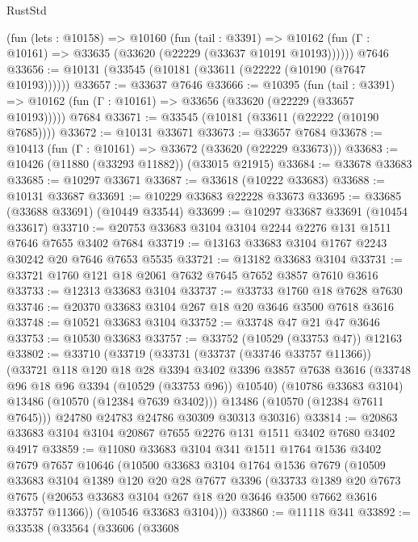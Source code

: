 \begin{lexlean}{RustStd}
\begin{coremodule}
    (fun (lets : @10158) =>
    @10160
      (fun (tail : @3391) =>
      @10162 (fun (Γ : @10161) => @33635 (@33620 (@22229 (@33637 @10191 @10193))))))
    @7646
@33656 := @10131 (@33545 (@10181 (@33611 (@22222 (@10190 (@7647 @10193))))))
@33657 := @33637 @7646
@33666 := @10395
    (fun (tail : @3391) => @10162 (fun (Γ : @10161) => @33656 (@33620 (@22229 (@33657 @10193)))))
    @7684
@33671 := @33545 (@10181 (@33611 (@22222 (@10190 @7685))))
@33672 := @10131 @33671
@33673 := @33657 @7684
@33678 := @10413 (fun (Γ : @10161) => @33672 (@33620 (@22229 @33673)))
@33683 := @10426 (@11880 (@33293 @11882)) (@33015 @21915)
@33684 := @33678 @33683
@33685 := @10297 @33671
@33687 := @33618 (@10222 @33683)
@33688 := @10131 @33687
@33691 := @10229 @33683 @22228 @33673
@33695 := @33685 (@33688 @33691) (@10449 @33544)
@33699 := @10297 @33687 @33691 (@10454 @33617)
@33710 := @20753 @33683 @3104 @3104 @2244 @2276 @131 @1511 @7646 @7655 @3402 @7684
@33719 := @13163 @33683 @3104 @1767 @2243 @30242 @20 @7646 @7653 @5535
@33721 := @13182 @33683 @3104
@33731 := @33721 @1760 @121 @18 @2061 @7632 @7645 @7652 @3857 @7610 @3616
@33733 := @12313 @33683 @3104
@33737 := @33733 @1760 @18 @7628 @7630
@33746 := @20370 @33683 @3104 @267 @18 @20 @3646 @3500 @7618 @3616
@33748 := @10521 @33683 @3104
@33752 := @33748 @47 @21 @47 @3646
@33753 := @10530 @33683
@33757 := @33752 (@10529 (@33753 @47)) @12163
@33802 := @33710
    (@33719
      (@33731
        (@33737 (@33746 @33757 @11366))
        (@33721
          @118
          @120
          @18
          @28
          @3394
          @3402
          @3396
          @3857
          @7638
          @3616
          (@33748 @96 @18 @96 @3394 (@10529 (@33753 @96)) @10540)
          (@10786 @33683 @3104)
          @13486
          (@10570 (@12384 @7639 @3402)))
        @13486
        (@10570 (@12384 @7611 @7645)))
      @24780
      @24783
      @24786
      @30309
      @30313
      @30316)
@33814 := @20863 @33683 @3104 @3104 @20867 @7655 @2276 @131 @1511 @3402 @7680 @3402 @4917
@33859 := @11080
    @33683
    @3104
    @341
    @1511
    @1764
    @1536
    @3402
    @7679
    @7657
    @10646
    (@10500
      @33683
      @3104
      @1764
      @1536
      @7679
      (@10509
        @33683
        @3104
        @1389
        @120
        @20
        @28
        @7677
        @3396
        (@33733
          @1389
          @20
          @7673
          @7675
          (@20653 @33683 @3104 @267 @18 @20 @3646 @3500 @7662 @3616 @33757 @11366))
        (@10546 @33683 @3104)))
@33860 := @11118 @341
@33892 := @33538
    (@33564
      (@33606
        (@33608

\end{coremodule}
\end{lexlean}
